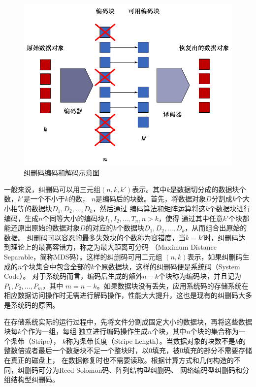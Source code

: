 \begin{figure}[tb]
	\centering
	\includegraphics [scale=0.8]{figures/1.2.pdf}
	\caption{纠删码编码和解码示意图}
	\label{fig:con-1.2}
\end{figure}







一般来说，纠删码可以用三元组$(n,k,k')$表示。其中$k$是数据切分成的数据块个数，$k'$是一个不小于$k$的数，
$n$是编码后的块数。首先，将数据对象$D$分割成$k$个大小相等的数据块$D_1,D_2,...,D_k$，然后通过
编码算法和矩阵运算将这$k$个数据块进行编码，生成$n$个同等大小的编码块$I_1,I_2,...,T_n,n>k$，使得
通过其中任意$k'$个块都能还原出原始的数据对象$D$的对应的$k$个数据块$D_1,D_2,...,D_k$，从而组合出原始的数据。
纠删码可以容忍的最多失效块的个数称为容错度，当$k=k'$时，纠删码达到理论上的最高容错力，称之为最大距离可分码
（Maximum Distance Separable，简称MDS码）\cite{blaum1996mds}。这样的纠删码可用二元组
$(n,k)$表示，如果纠删码生成的$n$个块集合中包含全部的$k$个原数据块，这样的纠删码便是系统码（System Code）\cite{plank2009raid}。
对于系统码而言，编码后生成的额外$n-k$个块称为编码块，并且记为$P_1,P_2,...,P_m$，其中
$m=n-k$。如果数据块没有丢失，应用系统码的存储系统在相应数据访问操作时无需进行解码操作，性能大大提升，这也是现有的纠删码大多是系统码的原因。

在存储系统实际的运行过程中，先将文件分割成固定大小的数据块，再将这些数据块每$k$个作为一组，每组
独立进行编码操作生成$n$个块，其中$n$个块的集合称为一个条带（Stripe）\cite{hafner2005matrix}，
$k$称为条带长度（Stripe Length）。当数据对象的块数不是$k$的整数倍或者最后一个数据块不足一个整块时，以0填充，被0填充的部分不需要存储在真正的磁盘上，
在数据修复时也不需要读取。根据计算方式和几何构造的不同，纠删码可分为Reed-Solomon码、阵列结构型纠删码、
网络编码型纠删码和分组结构型纠删码。

